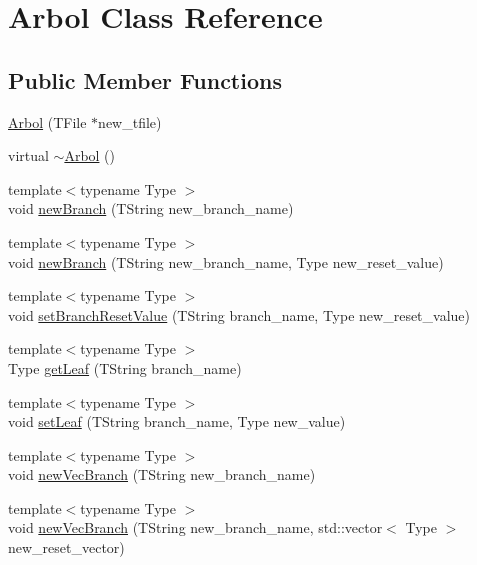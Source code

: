 \hypertarget{classArbol}{}\section{Arbol Class Reference}
\label{classArbol}
\subsection*{Public Member Functions}
\begin{DoxyCompactItemize}
\item 
\hyperlink{classArbol_a70f09d1535c225d3d8bc565d468ffe56}{Arbol} (T\+File $\ast$new\+\_\+tfile)
\item 
virtual \hyperlink{classArbol_ab9929184ef12844034b5ad4375a09799}{$\sim$\+Arbol} ()
\item 
{\footnotesize template$<$typename Type $>$ }\\void \hyperlink{classArbol_a552622885ffce15f1b1369fe44e729bb}{new\+Branch} (T\+String new\+\_\+branch\+\_\+name)
\item 
{\footnotesize template$<$typename Type $>$ }\\void \hyperlink{classArbol_a5f38b399beb87ec5bf8cb53ff126d501}{new\+Branch} (T\+String new\+\_\+branch\+\_\+name, Type new\+\_\+reset\+\_\+value)
\item 
{\footnotesize template$<$typename Type $>$ }\\void \hyperlink{classArbol_a38f72c5553a435a5b0e37ca55752126c}{set\+Branch\+Reset\+Value} (T\+String branch\+\_\+name, Type new\+\_\+reset\+\_\+value)
\item 
{\footnotesize template$<$typename Type $>$ }\\Type \hyperlink{classArbol_a92be3f8c4258247d65e7f66a8da70453}{get\+Leaf} (T\+String branch\+\_\+name)
\item 
{\footnotesize template$<$typename Type $>$ }\\void \hyperlink{classArbol_a7a8d3bec0bf5c00635a0b00fcd63cf01}{set\+Leaf} (T\+String branch\+\_\+name, Type new\+\_\+value)
\item 
{\footnotesize template$<$typename Type $>$ }\\void \hyperlink{classArbol_a57b6cf7cca6cbb3b75bb0e0333dbe3c8}{new\+Vec\+Branch} (T\+String new\+\_\+branch\+\_\+name)
\item 
{\footnotesize template$<$typename Type $>$ }\\void \hyperlink{classArbol_aee48fcb853b21527bb67d733a7c5b1b3}{new\+Vec\+Branch} (T\+String new\+\_\+branch\+\_\+name, std\+::vector$<$ Type $>$ new\+\_\+reset\+\_\+vector)

\end{DoxyCompactItemize}

